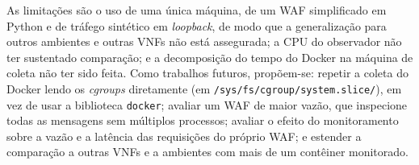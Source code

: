 \documentclass{ieeeaccess}
\begin{document}
As limitações são o uso de uma única máquina, de um WAF simplificado em Python e de tráfego sintético em \textit{loopback}, de modo que a generalização para outros ambientes e outras VNFs não está assegurada; a CPU do observador não ter sustentado comparação; e a decomposição do tempo do Docker na máquina de coleta não ter sido feita. Como trabalhos futuros, propõem-se: repetir a coleta do Docker lendo os \textit{cgroups} diretamente (em \texttt{/sys/fs/cgroup/system.slice/}), em vez de usar a biblioteca \texttt{docker}; avaliar um WAF de maior vazão, que inspecione todas as mensagens sem múltiplos processos; avaliar o efeito do monitoramento sobre a vazão e a latência das requisições do próprio WAF; e estender a comparação a outras VNFs e a ambientes com mais de um contêiner monitorado.




\EOD
\end{document}
